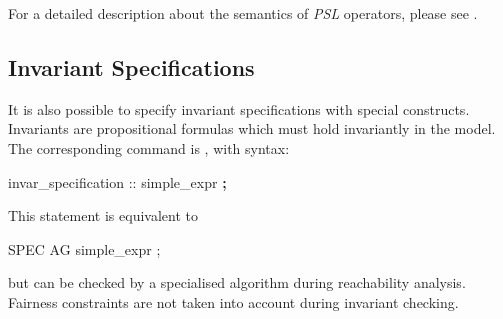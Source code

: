 For a detailed description about the semantics of \emph{PSL}
operators, please see \cite{PSLLRM}. 

\subsection{Invariant Specifications}
\label{INVAR Specifications}

It is also possible to specify invariant specifications with special
constructs. Invariants are propositional formulas which must hold
invariantly in the model.
%
The corresponding command is , with syntax:
%
\begin{Grammar}
invar_specification ::  simple_expr \textbf{;}
\end{Grammar}
%
This statement is equivalent to 
%
\begin{Grammar}
SPEC  AG simple_expr ;
\end{Grammar}
%
but can be checked by a specialised algorithm during reachability
analysis. Fairness constraints are not taken into account during
invariant checking.

